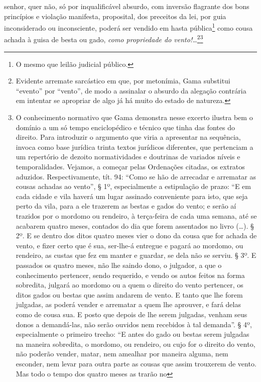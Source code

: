 {senhor, quer não, só por inqualificável absurdo, com inversão flagrante
dos bons princípios e violação manifesta, proposital, dos preceitos da
lei, por guia inconsiderado ou inconsciente, poderá ser vendido em hasta
pública\footnote{O mesmo que leilão judicial público.} como cousa
achada à guisa de besta ou gado, \emph{como propriedade do
vento!\ldots{}}\footnote{Evidente arremate sarcástico em que, por
  metonímia, Gama substitui ``evento'' por ``vento'', de modo a assinalar o
  absurdo da alegação contrária em intentar se apropriar de algo já há
  muito do estado de natureza.}\footnote{O conhecimento normativo que
  Gama demonstra nesse excerto ilustra bem o domínio a um só tempo
  enciclopédico e técnico que tinha das fontes do direito. Para
  introduzir o argumento que viria a apresentar na sequência, invoca
  como base jurídica trinta textos jurídicos diferentes, que pertenciam
  a um repertório de dezoito normatividades e doutrinas de variados
  níveis e temporalidades.
  Vejamos, a começar pelas Ordenações citadas,
  os extratos aduzidos. Respectivamente, tít. 94: ``Como se hão de
  arrecadar e arrematar as cousas achadas ao vento'', § 1º,
  especialmente a estipulação de prazo: ``E em cada cidade e vila
  haverá um lugar assinado conveniente para isto, que seja perto da
  vila, para a ele trazerem as bestas e gados do vento; e serão aí
  trazidos por o mordomo ou rendeiro, à terça-feira de cada uma semana,
  até se acabarem quatro meses, contados do dia que forem assentados no
  livro (\ldots{}). § 2º. E se dentro dos ditos quatro meses vier o dono da
  cousa que for achada de vento, e fizer certo que é sua, ser-lhe-á
  entregue e pagará ao mordomo, ou rendeiro, as custas que fez em manter
  e guardar, se dela não se serviu. § 3º. E passados os quatro meses,
  não lhe saindo dono, o julgador, a que o conhecimento pertencer, sendo
  requerido, e vendo os autos feitos na forma sobredita, julgará ao
  mordomo ou a quem o direito do vento pertencer, os ditos gados ou
  bestas que assim andarem de vento. E tanto que lhe forem julgadas, as
  poderá vender e arrematar a quem lhe aprouver, e fará delas como de
  cousa sua. E posto que depois de lhe serem julgadas, venham seus donos
  a demandá-las, não serão ouvidos nem recebidos à tal demanda''. § 4º,
  especialmente o primeiro trecho: ``E antes do gado ou bestas serem
  julgadas na maneira sobredita, o mordomo, ou rendeiro, ou cujo for o
  direito do vento, não poderão vender, matar, nem amealhar por maneira
  alguma, nem esconder, nem levar para outra parte as cousas que assim
  trouxerem de vento. Mas todo o tempo dos quatro meses as trarão no
}}
